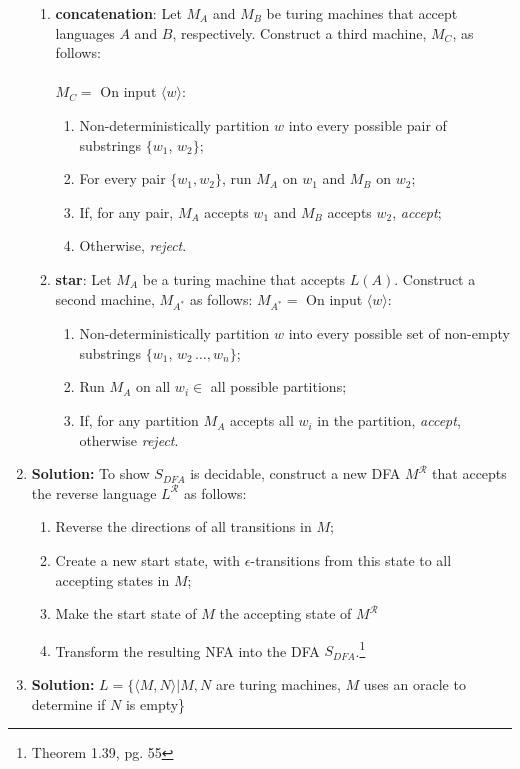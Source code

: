 \documentclass{article}
\begin{document}
\begin{enumerate}
\begin{enumerate}
            \item \textbf{concatenation}: Let $M_{A}$ and $M_{B}$ be turing machines that accept languages $A$ and $B$, respectively. Construct a third machine, $M_{C}$, as follows: \\ \\
            $M_{C} = $ On input $\langle w \rangle$: 
            \begin{enumerate}
                \item Non-deterministically partition $w$ into every possible pair of substrings $\{w_{1}$, $w_{2}\}$;
                \item For every pair $\{w_{1}, w_{2}\}$, run $M_{A}$ on $w_{1}$ and $M_{B}$ on $w_{2}$;
                \item If, for any pair, $M_{A}$ accepts $w_{1}$ and $M_{B}$ accepts $w_{2}$, \emph{accept};
                \item Otherwise, \emph{reject}.
            \end{enumerate}

            \item \textbf{star}: Let $M_{A}$ be a turing machine that accepts $L(A)$. Construct a second machine, $M_{A^{*}}$ as follows:
            $M_{A^{*}} = $ On input $\langle w \rangle$: 
            \begin{enumerate}
                \item Non-deterministically partition $w$ into every possible set of non-empty substrings $\{w_{1}$, $w_{2}\, \dots, w_{n}\}$;
                \item Run $M_{A}$ on all $w_{i} \in$ all possible partitions;
                \item If, for any partition $M_{A}$ accepts all $w_{i}$ in the partition, \emph{accept}, otherwise \emph{reject}.
            \end{enumerate}
        \end{enumerate}
    \item \textbf{Solution:}
        To show $S_{DFA}$ is decidable, construct a new DFA $M^{\mathcal{R}}$ that accepts the reverse language $L^{\mathcal{R}}$ as follows:
        \begin{enumerate}
            \item Reverse the directions of all transitions in $M$;
            \item Create a new start state, with $\epsilon$-transitions from this state to all accepting states in $M$;
            \item Make the start state of $M$ the accepting state of $M^{\mathcal{R}}$
            \item Transform the resulting NFA into the DFA $S_{DFA}$.\footnote{Theorem 1.39, pg. 55}
        \end{enumerate}
    \item \textbf{Solution:}
        $L = \{\langle M, N\rangle|M, N$ are turing machines, $M$ uses an oracle to determine if $N$ is empty\} 


\end{enumerate}
\end{document}
